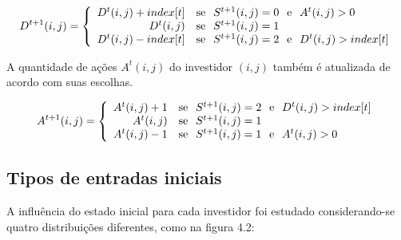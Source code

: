 \documentclass[brazil,ruledheader]{abnt}
\begin{document}
\begin{equation}
D^{t+1}(i,j)=\left\{ \begin{array}{rl}
D^t(i,j)+index[t] & \mbox{se\hspace{.7em}} S^{t+1}(i,j)=0
\mbox{\hspace{.7em}e\hspace{.7em}} A^t(i,j)>0\\
D^t(i,j) & \mbox{se\hspace{.7em}} S^{t+1}(i,j)=1 \\
D^t(i,j)-index[t] & \mbox{se\hspace{.7em}}
S^{t+1}(i,j)=2\mbox{\hspace{.7em}e\hspace{.7em}} D^t(i,j) > index[t]\\
\end{array}\right.
\end{equation}

A quantidade de ações $A^t(i,j)$ do investidor $(i,j)$ também é atualizada de
acordo com suas escolhas.

\begin{equation}
A^{t+1}(i,j)=\left\{ \begin{array}{rl}
A^t(i,j)+1 & \mbox{se\hspace{.7em}} S^{t+1}(i,j)=2
\mbox{\hspace{.7em}e\hspace{.7em}} D^t(i,j)>index[t]\\
A^t(i,j) & \mbox{se\hspace{.7em}} S^{t+1}(i,j)=1 \\
A^t(i,j)-1 & \mbox{se\hspace{.7em}} S^{t+1}(i,j)=1
\mbox{\hspace{.7em}e\hspace{.7em}} A^t(i,j) > 0\\
\end{array}\right.
\end{equation}

\subsection{Tipos de entradas iniciais}

A influência do estado inicial para cada investidor foi estudado
considerando-se quatro
distribuições diferentes, como na figura 4.2:
\end{document}
